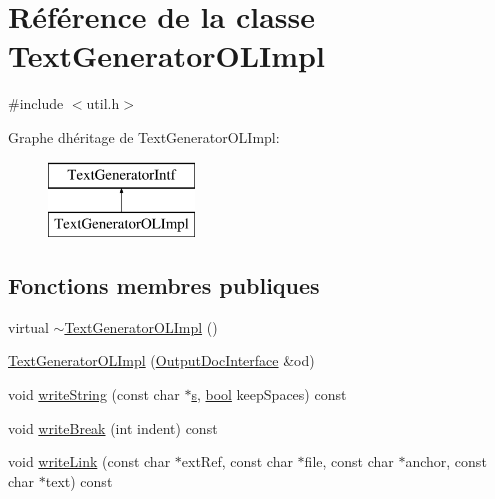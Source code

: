 \hypertarget{class_text_generator_o_l_impl}{}\section{Référence de la classe Text\+Generator\+O\+L\+Impl}
\label{class_text_generator_o_l_impl}


{\ttfamily \#include $<$util.\+h$>$}

Graphe d\textquotesingle{}héritage de Text\+Generator\+O\+L\+Impl\+:\begin{figure}[H]
\begin{center}
\leavevmode
\includegraphics[height=2.000000cm]{class_text_generator_o_l_impl}
\end{center}
\end{figure}
\subsection*{Fonctions membres publiques}
\begin{DoxyCompactItemize}
\item 
virtual \hyperlink{class_text_generator_o_l_impl_a5320b8f52a5ee42806aa54ab0af480db}{$\sim$\+Text\+Generator\+O\+L\+Impl} ()
\item 
\hyperlink{class_text_generator_o_l_impl_aaa9f4eb087cfa289b62697719b5f712e}{Text\+Generator\+O\+L\+Impl} (\hyperlink{class_output_doc_interface}{Output\+Doc\+Interface} \&od)
\item 
void \hyperlink{class_text_generator_o_l_impl_a54a566e4ea32832b71e315e77c183d49}{write\+String} (const char $\ast$\hyperlink{060__command__switch_8tcl_a011c73f2dbb87635a3b4206c72355f6e}{s}, \hyperlink{qglobal_8h_a1062901a7428fdd9c7f180f5e01ea056}{bool} keep\+Spaces) const 
\item 
void \hyperlink{class_text_generator_o_l_impl_a0bcf0edafe3dfa799a2c3cf452212bed}{write\+Break} (int indent) const 
\item 
void \hyperlink{class_text_generator_o_l_impl_a3580d240ebc06ae4245b22905b94dfe3}{write\+Link} (const char $\ast$ext\+Ref, const char $\ast$file, const char $\ast$anchor, const char $\ast$text) const 
\end{DoxyCompactItemize}


